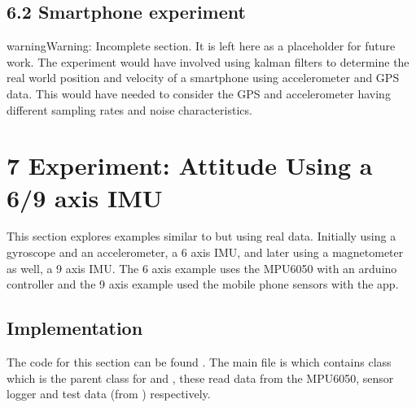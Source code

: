 \documentclass[letterpaper,10pt,english]{jupyterBook}
\begin{document}
\section{6.2 Smartphone experiment}
\label{\detokenize{6ExtendedKalman:smartphone-experiment}}
\begin{sphinxadmonition}{warning}{Warning:}
\sphinxAtStartPar
Incomplete section. It is left here as a placeholder for future work. The experiment would have involved using kalman filters to determine the real world position and velocity of a smartphone using accelerometer and GPS data. This would have needed to consider the GPS and accelerometer having different sampling rates and noise characteristics.
\end{sphinxadmonition}

\sphinxstepscope


\chapter{7 Experiment: Attitude Using a 6/9 axis IMU}
\label{\detokenize{7RealData:experiment-attitude-using-a-6-9-axis-imu}}\label{\detokenize{7RealData::doc}}
\sphinxAtStartPar
This section explores examples similar to {\hyperref[\detokenize{5IMU::doc}]{}} but using real data. Initially using a gyroscope and an accelerometer, a 6 axis IMU, and later using a magnetometer as well, a 9 axis IMU. The 6 axis example uses the MPU6050 with an arduino controller and the 9 axis example used the mobile phone sensors with the  app.


\section{Implementation}
\label{\detokenize{7RealData:implementation}}
\sphinxAtStartPar
The code for this section can be found . The main file is  which contains  class which is the parent class for  and , these read data from the MPU6050, sensor logger and test data (from {\hyperref[\detokenize{5IMU::doc}]{}}) respectively.
\end{document}
